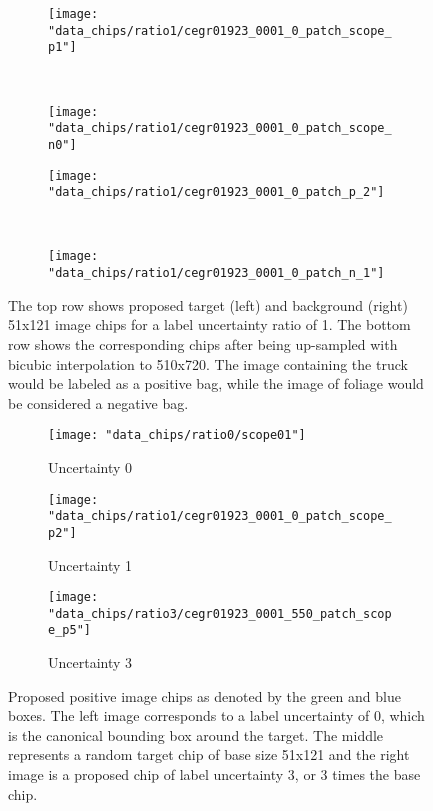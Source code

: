 \begin{figure*}[t!]
	\hfill
	\begin{subfigure}[t]{0.5\textwidth}
		\texttt{[image: "data\_chips/ratio1/cegr01923\_0001\_0\_patch\_scope\_p1"]}
	\end{subfigure}%
	\centering
	~ 
	\begin{subfigure}[t]{0.5\textwidth}
		\centering
		\texttt{[image: "data\_chips/ratio1/cegr01923\_0001\_0\_patch\_scope\_n0"]}
	\end{subfigure}
	
	
	\begin{subfigure}[t]{0.5\textwidth}
		\texttt{[image: "data\_chips/ratio1/cegr01923\_0001\_0\_patch\_p\_2"]}
	\end{subfigure}%
	\centering
	~ 
	\begin{subfigure}[t]{0.5\textwidth}
		\centering
		\texttt{[image: "data\_chips/ratio1/cegr01923\_0001\_0\_patch\_n\_1"]}
	\end{subfigure}%
	\caption[Image chip extraction]{The top row shows proposed target (left) and background (right) 51x121 image chips for a label uncertainty ratio of 1. The bottom row shows the corresponding chips after being up-sampled with bicubic interpolation to 510x720.  The image containing the truck would be labeled as a positive bag, while the image of foliage would be considered a negative bag. }
	\label{fig:chip_extraction}%
\end{figure*}


\begin{figure*}[t!]
	\hfill
	\begin{subfigure}[t]{0.3\textwidth}
		\texttt{[image: "data\_chips/ratio0/scope01"]}
		\caption{Uncertainty 0}
	\end{subfigure}%
	\hfill
	\begin{subfigure}[t]{0.3\textwidth}
		\texttt{[image: "data\_chips/ratio1/cegr01923\_0001\_0\_patch\_scope\_p2"]}
		\caption{Uncertainty 1}
	\end{subfigure}
	\hfill
	\begin{subfigure}[t]{0.3\textwidth}
		\texttt{[image: "data\_chips/ratio3/cegr01923\_0001\_550\_patch\_scope\_p5"]}
		\caption{Uncertainty 3}
	\end{subfigure}%
	
	\caption[Image chip uncertainty]{Proposed positive image chips as denoted by the green and blue boxes.  The left image corresponds to a label uncertainty of 0, which is the canonical bounding box around the target.  The middle represents a random target chip of base size 51x121 and the right image is a proposed chip of label uncertainty 3, or 3 times the base chip.}
	\label{fig:chip_uncertainty}%
\end{figure*}



